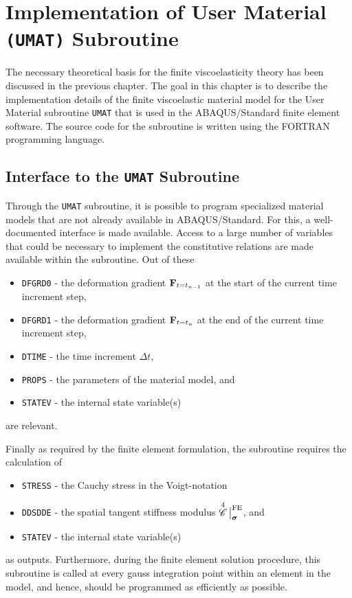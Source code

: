 \chapter{Implementation of User Material \texttt{(UMAT)} Subroutine}%
\label{chapter:three} 
The necessary theoretical basis for the finite viscoelasticity theory has been discussed in the previous chapter. The goal in this chapter is to describe the implementation details of the finite viscoelastic material model for the User Material subroutine \texttt{UMAT} that is used in the ABAQUS/Standard finite element software. The source code for the subroutine is written using the FORTRAN programming language.

\section{Interface to the \texttt{UMAT} Subroutine}
Through the \texttt{UMAT} subroutine, it is possible to program specialized material models that are not already available in ABAQUS/Standard. For this, a well-documented interface is made available. Access to a large number of variables that could be necessary to implement the constitutive relations are made available within the subroutine. Out of these 
\begin{itemize}
    \item \texttt{DFGRD0} - the deformation gradient \(\mathbf{F}_{t=t_{n-1}}\) at the start of the current time increment step,
    \item \texttt{DFGRD1} - the deformation gradient \(\mathbf{F}_{t=t_{n}}\) at the end of the current time increment step,
    \item \texttt{DTIME} - the time increment \(\Delta t\),
    \item \texttt{PROPS} - the parameters of the material model, and 
    \item \texttt{STATEV} - the internal state variable(s)
\end{itemize}
are relevant. 

Finally as required by the finite element formulation, the subroutine requires the calculation of 
\begin{itemize}
    \item \texttt{STRESS} - the Cauchy stress in the Voigt-notation
    \item \texttt{DDSDDE} - the spatial tangent stiffness modulus \({\overset{4}{\mathscr{C}}}{\,\big|}^{\text{FE}}_{\bm{\sigma}}\), and
    \item \texttt{STATEV} - the internal state variable(s)
\end{itemize}
as outputs. Furthermore, during the finite element solution procedure, this subroutine is called at every gauss integration point within an element in the model, and hence, should be programmed as efficiently as possible.

